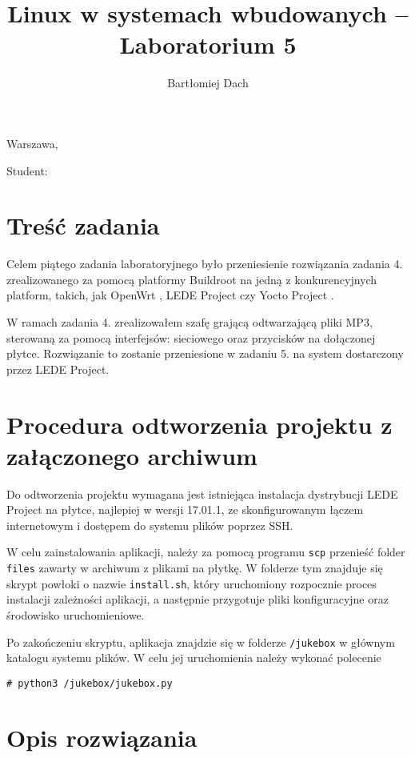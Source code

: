 \documentclass[10pt,a4paper]{article}
\title{Linux w systemach wbudowanych -- Laboratorium 5}
\author{Bartłomiej Dach}
\begin{document}
\makeatletter
\begin{flushright}
	Warszawa, \@date
\end{flushright}
\begin{center}
	\LARGE{\@title}
\end{center}
\vspace{0.25cm}
Student: \@author
\makeatother

\section{Treść zadania}

Celem piątego zadania laboratoryjnego było przeniesienie rozwiązania zadania 4. zrealizowanego
za pomocą platformy Buildroot na jedną z konkurencyjnych platform, takich, jak OpenWrt
\cite{openwrt}, LEDE Project \cite{lede} czy Yocto Project \cite{yocto}.

W ramach zadania 4. zrealizowałem szafę grającą odtwarzającą pliki MP3, sterowaną za pomocą
interfejsów: sieciowego oraz przycisków na dołączonej płytce. Rozwiązanie to zostanie przeniesione
w zadaniu 5. na system dostarczony przez LEDE Project.

\section{Procedura odtworzenia projektu z załączonego archiwum}

Do odtworzenia projektu wymagana jest istniejąca instalacja dystrybucji LEDE Project na płytce,
najlepiej w wersji 17.01.1, ze skonfigurowanym łączem internetowym i dostępem do systemu plików
poprzez SSH.

W celu zainstalowania aplikacji, należy za pomocą programu \texttt{scp} przenieść folder
\texttt{files} zawarty w archiwum z plikami na płytkę. W folderze tym znajduje się skrypt powłoki
o nazwie \texttt{install.sh}, który uruchomiony rozpocznie proces instalacji zależności aplikacji,
a następnie przygotuje pliki konfiguracyjne oraz środowisko uruchomieniowe.

Po zakończeniu skryptu, aplikacja znajdzie się w folderze \texttt{/jukebox} w głównym katalogu
systemu plików. W celu jej uruchomienia należy wykonać polecenie

\begin{lstlisting}
# python3 /jukebox/jukebox.py
\end{lstlisting}

\section{Opis rozwiązania}
\end{document}
